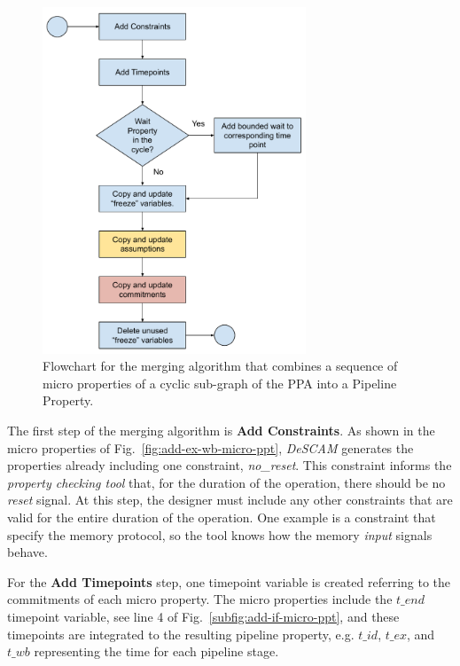 \begin{figure}[htb!]
	\centering
	\includegraphics[width=0.7\textwidth]{images/algorithm.pdf}
	\caption{Flowchart for the merging algorithm that combines a sequence of micro properties of a cyclic sub-graph of the PPA into a Pipeline Property.}
	\label{fig:algorithm-flow}
\end{figure}

The first step of the merging algorithm is \textbf{Add Constraints}. As shown in the micro properties of Fig.~\ref{fig:add-ex-wb-micro-ppt}, \textit{DeSCAM} generates the properties already including one constraint, \textit{no\_reset}. This constraint informs the \textit{property checking tool} that, for the duration of the operation, there should be no \textit{reset} signal. At this step, the designer must include any other constraints that are valid for the entire duration of the operation. One example is a constraint that specify the memory protocol, so the tool knows how the memory \textit{input} signals behave.

For the \textbf{Add Timepoints} step, one timepoint variable is created referring to the commitments of each micro property. The micro properties include the $t\_end$ timepoint variable, see line 4 of Fig.~\ref{subfig:add-if-micro-ppt}, and these timepoints are integrated to the resulting pipeline property, e.g. $t\_id$, $t\_ex$, and $t\_wb$ representing the time for each pipeline stage.

